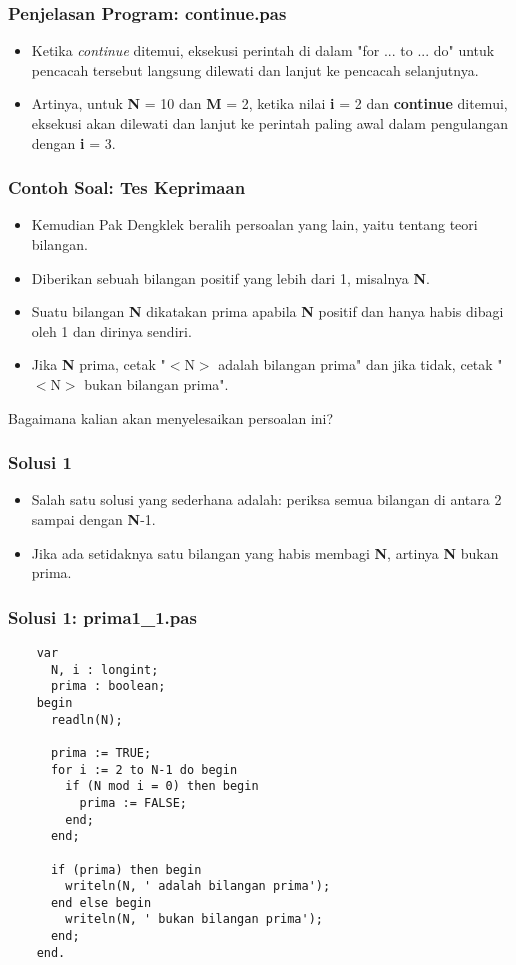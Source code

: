 \documentclass{beamer}
\begin{document}
\begin{frame}
\frametitle{Penjelasan Program: continue.pas}
\begin{itemize}
  \item Ketika \textit{continue} ditemui, eksekusi perintah di dalam "for ... to ... do" untuk pencacah tersebut langsung dilewati dan lanjut ke pencacah selanjutnya.
  \item Artinya, untuk \textbf{N} = 10 dan \textbf{M} = 2, ketika nilai \textbf{i} = 2 dan \textbf{continue} ditemui, eksekusi akan dilewati dan lanjut ke perintah paling awal dalam pengulangan dengan \textbf{i} = 3.
\end{itemize}
\end{frame}


\begin{frame}
\frametitle{Contoh Soal: Tes Keprimaan}
\begin{itemize}
  \item Kemudian Pak Dengklek beralih persoalan yang lain, yaitu tentang teori bilangan.
  \item Diberikan sebuah bilangan positif yang lebih dari 1, misalnya \textbf{N}.
  \item Suatu bilangan \textbf{N} dikatakan prima apabila \textbf{N} positif dan hanya habis dibagi oleh 1 dan dirinya sendiri.
  \item Jika \textbf{N} prima, cetak "$<$N$>$ adalah bilangan prima" dan jika tidak, cetak "$<$N$>$ bukan bilangan prima".
\end{itemize}
Bagaimana kalian akan menyelesaikan persoalan ini?
\end{frame}

\begin{frame}
\frametitle{Solusi 1}
\begin{itemize}
  \item Salah satu solusi yang sederhana adalah: periksa semua bilangan di antara 2 sampai dengan \textbf{N}-1.
  \item Jika ada setidaknya satu bilangan yang habis membagi \textbf{N}, artinya \textbf{N} bukan prima.
\end{itemize}
\end{frame}


\begin{frame}[fragile]
\frametitle{Solusi 1: prima1\_1.pas}
  \begin{lstlisting}
    var
      N, i : longint;
      prima : boolean;
    begin
      readln(N);

      prima := TRUE;
      for i := 2 to N-1 do begin
        if (N mod i = 0) then begin
          prima := FALSE;
        end;
      end;

      if (prima) then begin
        writeln(N, ' adalah bilangan prima');
      end else begin
        writeln(N, ' bukan bilangan prima');
      end;
    end.
  \end{lstlisting}
\end{frame}
\end{document}
